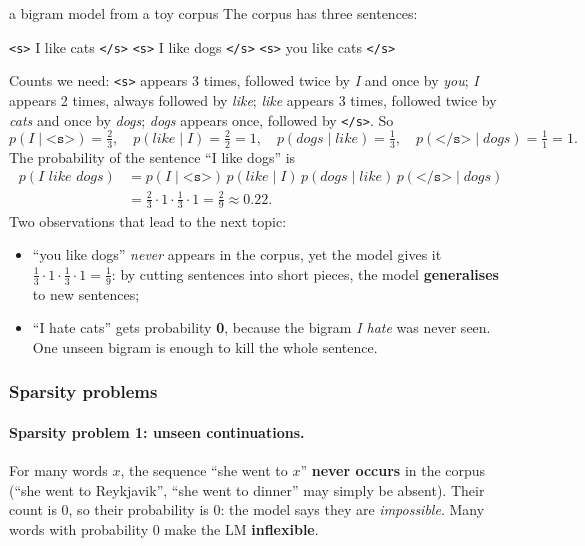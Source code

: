 \begin{nbexample}{a bigram model from a toy corpus}
\notinslides
The corpus has three sentences:
\begin{center}
\texttt{<s>} I like cats \texttt{</s>} \qquad
\texttt{<s>} I like dogs \texttt{</s>} \qquad
\texttt{<s>} you like cats \texttt{</s>}
\end{center}
Counts we need: \texttt{<s>} appears 3 times, followed twice by \emph{I} and once by
\emph{you}; \emph{I} appears 2 times, always followed by \emph{like}; \emph{like}
appears 3 times, followed twice by \emph{cats} and once by \emph{dogs}; \emph{dogs}
appears once, followed by \texttt{</s>}. So
\[
  p(\textit{I} \mid \texttt{<s>}) = \tfrac23, \quad
  p(\textit{like} \mid \textit{I}) = \tfrac22 = 1, \quad
  p(\textit{dogs} \mid \textit{like}) = \tfrac13, \quad
  p(\texttt{</s>} \mid \textit{dogs}) = \tfrac11 = 1 .
\]
The probability of the sentence ``I like dogs'' is
\begin{align*}
  p(\textit{I like dogs})
  &= p(\textit{I} \mid \texttt{<s>})\, p(\textit{like} \mid \textit{I})\,
     p(\textit{dogs} \mid \textit{like})\, p(\texttt{</s>} \mid \textit{dogs}) \\
  &= \tfrac23 \cdot 1 \cdot \tfrac13 \cdot 1 = \tfrac29 \approx 0.22 .
\end{align*}
Two observations that lead to the next topic:
\begin{itemize}[nosep]
  \item ``you like dogs'' \emph{never} appears in the corpus, yet the model gives it
        $\frac13 \cdot 1 \cdot \frac13 \cdot 1 = \frac19$: by cutting sentences into
        short pieces, the model \textbf{generalises} to new sentences;
  \item ``I hate cats'' gets probability \textbf{0}, because the bigram \emph{I hate}
        was never seen. One unseen bigram is enough to kill the whole sentence.
\end{itemize}
\end{nbexample}

\subsubsection{Sparsity problems}

\paragraph{Sparsity problem 1: unseen continuations.}
For many words $x$, the sequence ``she went to $x$'' \textbf{never occurs} in the
corpus (``she went to Reykjavik'', ``she went to dinner'' may simply be absent). Their
count is 0, so their probability is 0: the model says they are \emph{impossible}. Many
words with probability 0 make the LM \textbf{inflexible}.

